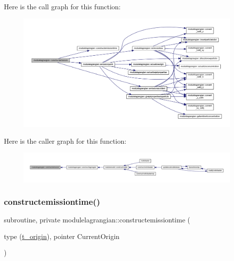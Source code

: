 Here is the call graph for this function\+:\nopagebreak
\begin{figure}[H]
\begin{center}
\leavevmode
\includegraphics[width=350pt]{namespacemodulelagrangian_ac0e529585f9aa6d77944f42eec49c399_cgraph}
\end{center}
\end{figure}
Here is the caller graph for this function\+:\nopagebreak
\begin{figure}[H]
\begin{center}
\leavevmode
\includegraphics[width=350pt]{namespacemodulelagrangian_ac0e529585f9aa6d77944f42eec49c399_icgraph}
\end{center}
\end{figure}
\mbox{\label{namespacemodulelagrangian_aeeff0dc876b075a641427da62012e39e}} 
\subsubsection{\texorpdfstring{constructemissiontime()}{constructemissiontime()}}
{\footnotesize\ttfamily subroutine, private modulelagrangian\+::constructemissiontime (\begin{DoxyParamCaption}\item[{type (\mbox{\hyperlink{structmodulelagrangian_1_1t__origin}{t\+\_\+origin}}), pointer}]{Current\+Origin }\end{DoxyParamCaption})\hspace{0.3cm}{\ttfamily [private]}}

